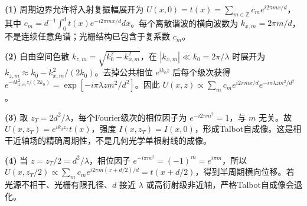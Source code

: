 \par\noindent\textbf{(1)} 周期边界允许将入射复振幅展开为 \(U(x,0)=t(x)=\sum_{m\in\mathbb Z}c_me^{i2\pi mx/d}\)，其中 \(c_m=d^{-1}\int_0^dt(x)e^{-i2\pi mx/d}dx\)。每个离散谐波的横向波数为 \(k_{x,m}=2\pi m/d\)，不是连续任意角谱；光栅结构已包含于复系数 \(c_m\)。
\par\noindent\textbf{(2)} 自由空间色散 \(k_{z,m}=\sqrt{k_0^2-k_{x,m}^2}\)，在 \(|k_{x,m}|\ll k_0=2\pi/\lambda\) 时展开为 \(k_{z,m}\approx k_0-k_{x,m}^2/(2k_0)\)。去掉公共相位 \(e^{ik_0z}\) 后每个级次获得 \(e^{-ik_{x,m}^2z/(2k_0)}=\exp[-i\pi\lambda z m^2/d^2]\)。因此 \(U(x,z)\propto\sum_m c_me^{i2\pi mx/d}e^{-i\pi\lambda zm^2/d^2}\)。
\par\noindent\textbf{(3)} 取 \(z_T=2d^2/\lambda\)，每个Fourier级次的相位因子为 \(e^{-i2\pi m^2}=1\)，与 \(m\) 无关。故 \(U(x,z_T)=e^{ik_0z_T}t(x)\)，强度 \(I(x,z_T)=I(x,0)\)，形成Talbot自成像。这是相干近轴场的精确周期性，不是几何光学单根射线的成像。
\par\noindent\textbf{(4)} 当 \(z=z_T/2=d^2/\lambda\)，相位因子 \(e^{-i\pi m^2}=(-1)^m=e^{i\pi m}\)，所以 \(U(x,z_T/2)\propto\sum_m c_me^{i2\pi m(x+d/2)/d}=t(x+d/2)\)，得到半周期横向位移。若光源不相干、光栅有限孔径、\(d\) 接近 \(\lambda\) 或高衍射级非近轴，严格Talbot自成像会退化。
